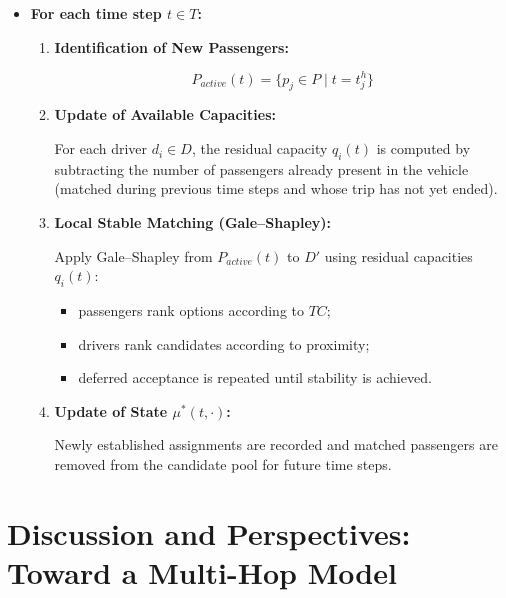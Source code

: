 \documentclass[12pt, a4paper]{article}
\begin{document}
\begin{itemize}
    \item[] \textbf{For each time step $t\in T$:}

    \begin{enumerate}

        \item \textbf{Identification of New Passengers:}

$$
P_{active}(t)=\{p_j\in P\mid t=t_j^h\}
$$

        \item \textbf{Update of Available Capacities:}

        For each driver $d_i\in D$, the residual capacity $q_i(t)$ is computed by subtracting the number of passengers already present in the vehicle (matched during previous time steps and whose trip has not yet ended).

        \item \textbf{Local Stable Matching (Gale--Shapley):}

        Apply Gale--Shapley from $P_{active}(t)$ to $D'$ using residual capacities $q_i(t)$:

        \begin{itemize}

            \item passengers rank options according to $TC$;

            \item drivers rank candidates according to proximity;

            \item deferred acceptance is repeated until stability is achieved.

        \end{itemize}

        \item \textbf{Update of State $\mu^*(t,\cdot)$:}

        Newly established assignments are recorded and matched passengers are removed from the candidate pool for future time steps.

    \end{enumerate}

\end{itemize}

\section{Discussion and Perspectives: Toward a Multi-Hop Model}
\end{document}
